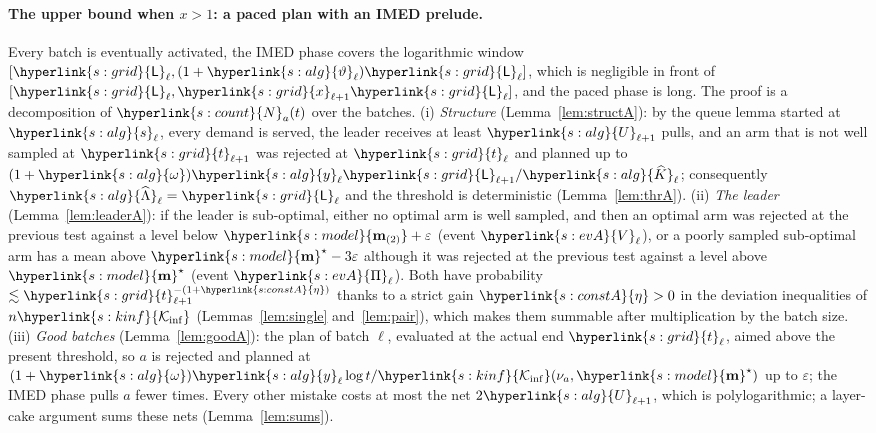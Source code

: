 \documentclass[10pt]{article}
\newcommand{\sy}[2]{{\hyperlink{#1}{#2}}}
\newcommand{\1}{\mathbf{1}}
\newcommand{\m}{\sy{s:model}{\mathbf{m}}}
\newcommand{\mtwo}{\sy{s:model}{\mathbf m_{(2)}}}
\newcommand{\Ki}{\sy{s:kinf}{\mathcal K_{\inf}}}
\newcommand{\Ng}{\sy{s:count}{N}}
\newcommand{\tl}{\sy{s:grid}{t}}
\newcommand{\Lg}{\sy{s:grid}{\mathsf L}}
\newcommand{\xg}{\sy{s:grid}{x}}
\newcommand{\yg}{\sy{s:alg}{y}}
\newcommand{\Ug}{\sy{s:alg}{U}}
\newcommand{\sA}{\sy{s:alg}{s}}
\newcommand{\Kh}{\sy{s:alg}{\widehat K}}
\newcommand{\Lh}{\sy{s:alg}{\widehat\Lambda}}
\newcommand{\om}{\sy{s:alg}{\omega}}
\newcommand{\thv}{\sy{s:alg}{\vartheta}}
\newcommand{\eg}{\sy{s:constA}{\eta}}
\newcommand{\Vg}{\sy{s:evA}{V}}
\newcommand{\Pig}{\sy{s:evA}{\Pi}}
\begin{document}
\paragraph{The upper bound when $x>1$: a paced plan with an IMED prelude.} Every batch is eventually activated, the IMED phase covers the logarithmic window
$[\Lg_\ell,(1+\thv_\ell)\Lg_\ell]$, which is negligible in front of $[\Lg_\ell,\xg_{\ell+1}\Lg_\ell]$, and the paced phase is long. The proof is a decomposition of $\Ng_a(t)$ over
the batches. (i) \emph{Structure} (Lemma~\ref{lem:structA}): by the queue lemma started at $\sA_\ell$, every demand is served,
the leader receives at least $\Ug_{\ell+1}$ pulls, and an arm that is not well sampled at $\tl_{\ell+1}$ was rejected at $\tl_\ell$ and planned up to
$(1+\om)\yg_\ell\Lg_{\ell+1}/\Kh_\ell$; consequently $\Lh_\ell=\Lg_\ell$ and the threshold is deterministic (Lemma~\ref{lem:thrA}). (ii) \emph{The leader}
(Lemma~\ref{lem:leaderA}): if the leader is sub-optimal, either no optimal arm is well sampled, and then an optimal arm was rejected at the previous test against a level
below $\mtwo+\varepsilon$ (event $\Vg_\ell$), or a poorly sampled sub-optimal arm has a mean above $\m^\star-3\varepsilon$ although it was rejected at the previous test
against a level above $\m^\star$ (event $\Pig_\ell$). Both have probability $\lesssim\tl_{\ell+1}^{-(1+\eg)}$ thanks to a strict gain $\eg>0$ in the deviation inequalities of
$n\Ki$ (Lemmas~\ref{lem:single} and~\ref{lem:pair}), which makes them summable after multiplication by the batch size. (iii) \emph{Good batches} (Lemma~\ref{lem:goodA}):
the plan of batch $\ell$, evaluated at the actual end $\tl_\ell$, aimed above the present threshold, so $a$ is rejected and planned at $(1+\om)\yg_\ell\log t/\Ki(\nu_a,\m^\star)$
up to $\varepsilon$; the IMED phase pulls $a$ fewer times. Every other mistake costs at most the net $2\Ug_{\ell+1}$, which is polylogarithmic; a layer-cake argument sums
these nets (Lemma~\ref{lem:sums}).
\end{document}
